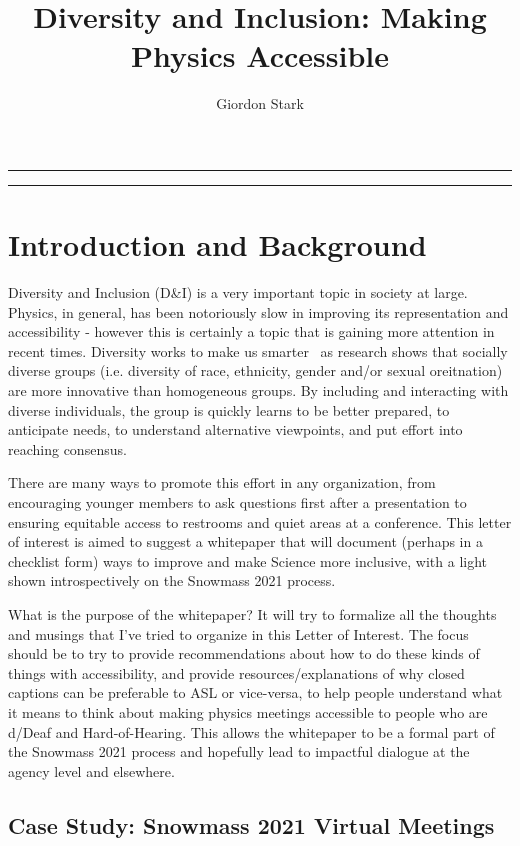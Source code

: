 \documentclass{article}
\title{Diversity and Inclusion: Making Physics Accessible}
\author[a]{Giordon Stark}
\affil[a]{SCIPP, UC Santa Cruz}
\date{}
\begin{document}
  \maketitle
  \hrule
  \vspace{0.5em}
  \hrule
  \vspace{2.5em}
  \section{Introduction and Background}
  Diversity and Inclusion (D&I) is a very important topic in society at large. Physics, in general, has been notoriously slow in improving its representation and accessibility - however this is certainly a topic that is gaining more attention in recent times. Diversity works to make us smarter~\cite{HowDiversityWorks} as research shows that socially diverse groups (i.e. diversity of race, ethnicity, gender and/or sexual oreitnation) are more innovative than homogeneous groups. By including and interacting with diverse individuals, the group is quickly learns to be better prepared, to anticipate needs, to understand alternative viewpoints, and put effort into reaching consensus.

  There are many ways to promote this effort in any organization, from encouraging younger members to ask questions first after a presentation to ensuring equitable access to restrooms and quiet areas at a conference. This letter of interest is aimed to suggest a whitepaper that will document (perhaps in a checklist form) ways to improve and make Science more inclusive, with a light shown introspectively on the Snowmass 2021 process.

  What is the purpose of the whitepaper? It will try to formalize all the thoughts and musings that I've tried to organize in this Letter of Interest. The focus should be to try to provide recommendations about how to do these kinds of things with accessibility, and provide resources/explanations of why closed captions can be preferable to ASL or vice-versa, to help people understand what it means to think about making physics meetings accessible to people who are d/Deaf and Hard-of-Hearing. This allows the whitepaper to be a formal part of the Snowmass 2021 process and hopefully lead to impactful dialogue at the agency level and elsewhere.

  \subsection{Case Study: Snowmass 2021 Virtual Meetings}
\end{document}
